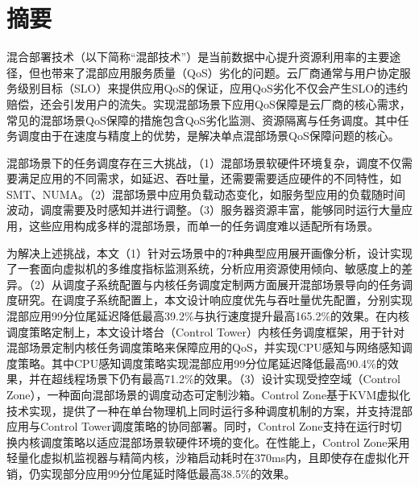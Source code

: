 
\maketitle%
\MAKETITLE%
\makedeclaration%
\intobmk\chapter*{摘\quad 要}%
\setcounter{page}{1}%


混合部署技术（以下简称“混部技术”）是当前数据中心提升资源利用率的主要途径，但也带来了混部应用服务质量（QoS）劣化的问题。云厂商通常与用户协定服务级别目标（SLO）来提供应用QoS的保证，应用QoS劣化不仅会产生SLO的违约赔偿，还会引发用户的流失。实现混部场景下应用QoS保障是云厂商的核心需求，常见的混部场景QoS保障的措施包含QoS劣化监测、资源隔离与任务调度。其中任务调度由于在速度与精度上的优势，是解决单点混部场景QoS保障问题的核心。

混部场景下的任务调度存在三大挑战，（1）混部场景软硬件环境复杂，调度不仅需要满足应用的不同需求，如延迟、吞吐量，还需要需要适应硬件的不同特性，如SMT、NUMA。（2）混部场景中应用负载动态变化，如服务型应用的负载随时间波动，调度需要及时感知并进行调整。（3）服务器资源丰富，能够同时运行大量应用，这些应用构成多样的混部场景，而单一的任务调度难以适配所有场景。

为解决上述挑战，本文（1）针对云场景中的7种典型应用展开画像分析，设计实现了一套面向虚拟机的多维度指标监测系统，分析应用资源使用倾向、敏感度上的差异。（2）从调度子系统配置与内核任务调度定制两方面展开混部场景导向的任务调度研究。在调度子系统配置上，本文设计响应度优先与吞吐量优先配置，分别实现混部应用99分位尾延迟降低最高39.2\%与执行速度提升最高165.2\%的效果。在内核调度策略定制上，本文设计塔台（Control Tower）内核任务调度框架，用于针对混部场景定制内核任务调度策略来保障应用的QoS，并实现CPU感知与网络感知调度策略。其中CPU感知调度策略实现混部应用99分位尾延迟降低最高90.4\%的效果，并在超线程场景下仍有最高71.2\%的效果。（3）设计实现受控空域（Control Zone），一种面向混部场景的调度动态可定制沙箱。Control Zone基于KVM虚拟化技术实现，提供了一种在单台物理机上同时运行多种调度机制的方案，并支持混部应用与Control Tower调度策略的协同部署。同时，Control Zone支持在运行时切换内核调度策略以适应混部场景软硬件环境的变化。在性能上，Control Zone采用轻量化虚拟机监视器与精简内核，沙箱启动耗时在370ms内，且即使存在虚拟化开销，仍实现部分应用99分位尾延时降低最高38.5\%的效果。

